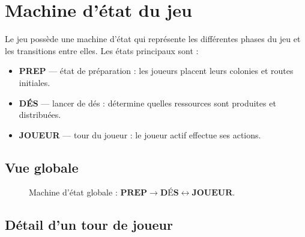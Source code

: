 \documentclass[11pt,a4paper]{article}
\begin{document}
\section{Machine d'état du jeu}

Le jeu possède une machine d'état qui représente les différentes phases du jeu et les
transitions entre elles. Les états principaux sont :

\begin{itemize}[nosep]
  \item \textbf{PREP} — état de préparation : les joueurs placent leurs colonies et
        routes initiales.
  \item \textbf{DÉS} — lancer de dés : détermine quelles ressources sont produites et
        distribuées.
  \item \textbf{JOUEUR} — tour du joueur : le joueur actif effectue ses actions.
\end{itemize}

\subsection{Vue globale}

\begin{figure}[h]
\centering
{}
\caption{Machine d'état globale : $\textbf{PREP} \to \textbf{DÉS}
\leftrightarrow \textbf{JOUEUR}$.}
\end{figure}

\subsection{Détail d'un tour de joueur}
\end{document}

